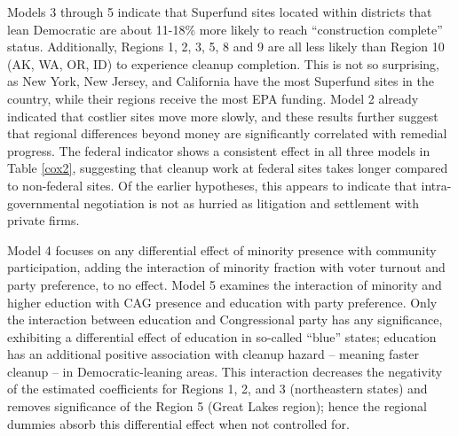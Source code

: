 \documentclass[12pt]{article}
\begin{document}
Models 3 through 5 indicate that Superfund sites located within districts that lean Democratic are about 11-18\% more likely to reach ``construction complete'' status. Additionally, Regions 1, 2, 3, 5, 8 and 9 are all less likely than Region 10 (AK, WA, OR, ID) to experience cleanup completion. This is not so surprising, as New York, New Jersey, and California have the most Superfund sites in the country, while their regions %
receive the most EPA funding. Model 2 already indicated that costlier sites move more slowly, and these results further suggest that regional differences beyond money are significantly correlated with remedial progress. The federal indicator shows a consistent effect in all three models in Table \ref{cox2}, suggesting that cleanup work at federal sites takes longer compared to non-federal sites. Of the earlier hypotheses, this appears to indicate that intra-governmental negotiation is not as hurried as litigation and settlement with private firms. 

Model 4 focuses on any differential effect of minority presence with community participation, adding the interaction of minority fraction with voter turnout and party preference, to no effect. Model 5 examines the interaction of minority and higher eduction with CAG presence and education with party preference. Only the interaction between education and Congressional party has any significance, exhibiting a differential effect of education in so-called ``blue'' states; education has an additional positive association with cleanup hazard -- meaning faster cleanup -- in Democratic-leaning areas. This interaction decreases the negativity of the estimated coefficients for Regions 1, 2, and 3 (northeastern states) and removes significance of the Region 5 (Great Lakes region); hence the regional dummies absorb this differential effect when not controlled for. 
\end{document}
